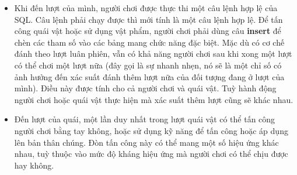 \begin{itemize}
	\item Khi đến lượt của mình, người chơi được thực thi một câu lệnh hợp lệ của SQL. Câu lệnh phải chạy được thì mới tính là một câu lệnh hợp lệ. Để tấn công quái vật hoặc sử dụng vật phẩm, người chơi phải dùng câu \textbf{insert} để chèn các tham số vào các bảng mang chức năng đặc biệt. Mặc dù có cơ chế đánh theo lượt luân phiên, vẫn có khả năng người chơi sau khi xong một lượt có thể chơi một lượt nữa (đây gọi là sự nhanh nhẹn, nó sẽ là một chỉ số có ảnh hưởng đến xác suất đánh thêm lượt nữa của đối tượng đang ở lượt của mình). Điều này được tính cho cả người chơi và quái vật. Tuỳ hành động người chơi hoặc quái vật thực hiện mà xác suất thêm lượt cũng sẽ khác nhau.
	\item Đến lượt của quái, một lần duy nhất trong lượt quái vật có thể tấn công người chơi bằng tay không, hoặc sử dụng kỹ năng để tấn công hoặc áp dụng lên bản thân chúng. Đòn tấn công này có thể mang một số hiệu ứng khác nhau, tuỳ thuộc vào mức độ kháng hiệu ứng mà người chơi có thể chịu được hay không.
\end{itemize}

